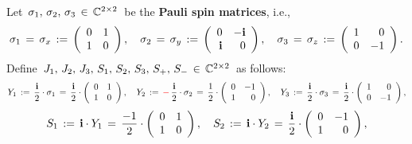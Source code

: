 \vskip 0.5cm
\begin{proposition}
\label{propnUsefulGeneratorsLittleSU2}
\mbox{}
\vskip 0.1cm
\noindent
Let \,$\sigma_{1},\, \sigma_{2},\, \sigma_{3} \,\in\, \mathbb{C}^{2 \times 2}$\, be the \textbf{Pauli spin matrices}, i.e.,
\begin{equation*}
\sigma_{1} \,=\, \sigma_{x} \,:=\, \left(\begin{array}{cc} 0 & 1 \\ 1 & 0 \end{array}\right),
\quad
\sigma_{2} \,=\, \sigma_{y} \,:=\, \left(\begin{array}{rr} 0 & -\textnormal{\bf i} \\ \textnormal{\bf i} & 0 \end{array}\right),
\quad
\sigma_{3} \,=\, \sigma_{z} \,:=\, \left(\begin{array}{rr} 1 & 0 \\ 0 & -1 \end{array}\right).
\end{equation*}
Define \,$J_{1},\, J_{2},\, J_{3},\, S_{1},\, S_{2},\, S_{3},\, S_{+},\, S_{-} \,\in\, \mathbb{C}^{2 \times 2}$\, as follows:
\begin{equation*}
Y_{1} \,:=\, \dfrac{\textnormal{\bf i}}{2}\cdot\sigma_{1} \,=\, \dfrac{\textnormal{\bf i}}{2}\cdot\left(\begin{array}{cc} 0 & 1 \\ 1 & 0 \end{array}\right),
\quad
Y_{2} \,:=\, \mathbf{{\color{red}-}}\,\dfrac{\textnormal{\bf i}}{2}\cdot\sigma_{2} \,=\, \dfrac{1}{2}\cdot\left(\begin{array}{rr} 0 & -1 \\ 1 & 0 \end{array}\right),
\quad
Y_{3} \,:=\, \dfrac{\textnormal{\bf i}}{2}\cdot\sigma_{3} \,=\, \dfrac{\textnormal{\bf i}}{2}\cdot\left(\begin{array}{rr} 1 & 0 \\ 0 & -1 \end{array}\right),
\end{equation*}
\begin{equation*}
S_{1} \,:=\, \i \cdot Y_{1} \,=\, \dfrac{-1}{2} \cdot \left(\begin{array}{rr} 0 & 1 \\ 1 & 0 \end{array}\right),
\quad
S_{2} \,:=\, \i \cdot Y_{2} \,=\, \dfrac{\i}{2} \cdot \left(\begin{array}{rr} 0 & -1 \\ 1 & 0 \end{array}\right),

\end{equation*}
\end{proposition}
